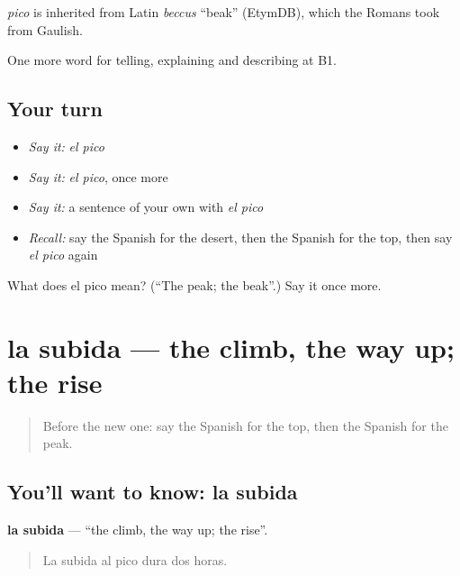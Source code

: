 \begin{cousinweb}
\emph{pico} is inherited from Latin \emph{beccus} \textquotedblleft{}beak\textquotedblright{} (EtymDB), which the Romans took from Gaulish.
\end{cousinweb}

\begin{grammarlens}[title={What you've built}]
One more word for telling, explaining and describing at B1.
\end{grammarlens}

\subsection*{Your turn}
\begin{itemize}
\raggedright
  \item \emph{Say it:} \emph{el pico}
  \item \emph{Say it:} \emph{el pico}, once more
  \item \emph{Say it:} a sentence of your own with \emph{el pico}
  \item \emph{Recall:} say the Spanish for the desert, then the Spanish for the top, then say \emph{el pico} again
\end{itemize}

\begin{tcolorbox}[breakable,colback=teal!4,colframe=teal!35!black,title={Before you move on}]
What does el pico mean? (\textquotedblleft{}The peak; the beak\textquotedblright{}.) Say it once more.
\end{tcolorbox}
\section[la subida]{la subida — the climb, the way up; the rise}

\label{lesson:ES-C686-subida}



\begin{quote}
Before the new one: say the Spanish for the top, then the Spanish for the peak.
\end{quote}

\subsection*{You'll want to know: la subida}
\textbf{la subida} — \textquotedblleft{}the climb, the way up; the rise\textquotedblright{}.

\begin{quote}
La subida al pico dura dos horas.
\end{quote}

